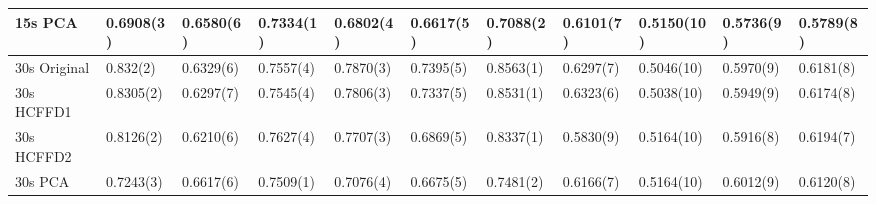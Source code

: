 \documentclass[conference]{IEEEtran}
\begin{document}
\begin{table}[]
\begin{tabular}{|l|l|l|l|l|l|l|l|l|l|l|l|l|l|l|l|l|l|l|l|l|}
15s PCA           & \multicolumn{3}{l|}{0.6908(3)}                                                & \multicolumn{3}{l|}{0.6580(6)}       & \multicolumn{3}{l|}{0.7334(1)}       & \multicolumn{3}{l|}{0.6802(4)}                                                    & \multicolumn{3}{l|}{0.6617(5)}  & 0.7088(2)                                                & 0.6101(7)                                              & 0.5150(10)    & 0.5736(9)  & 0.5789(8)                                                 \\ \hline
30s Original      & \multicolumn{3}{l|}{0.832(2)}                                                 & \multicolumn{3}{l|}{0.6329(6)}       & \multicolumn{3}{l|}{0.7557(4)}       & \multicolumn{3}{l|}{0.7870(3)}                                                    & \multicolumn{3}{l|}{0.7395(5)}  & 0.8563(1)                                                & 0.6297(7)                                              & 0.5046(10)    & 0.5970(9)  & 0.6181(8)                                                 \\ \hline
30s HCFFD1        & \multicolumn{3}{l|}{0.8305(2)}                                                & \multicolumn{3}{l|}{0.6297(7)}       & \multicolumn{3}{l|}{0.7545(4)}       & \multicolumn{3}{l|}{0.7806(3)}                                                    & \multicolumn{3}{l|}{0.7337(5)}  & 0.8531(1)                                                & 0.6323(6)                                              & 0.5038(10)    & 0.5949(9)  & 0.6174(8)                                                 \\ \hline
30s HCFFD2        & \multicolumn{3}{l|}{0.8126(2)}                                                & \multicolumn{3}{l|}{0.6210(6)}       & \multicolumn{3}{l|}{0.7627(4)}       & \multicolumn{3}{l|}{0.7707(3)}                                                    & \multicolumn{3}{l|}{0.6869(5)}  & 0.8337(1)                                                & 0.5830(9)                                              & 0.5164(10)    & 0.5916(8)  & 0.6194(7)                                                 \\ \hline
30s PCA           & \multicolumn{3}{l|}{0.7243(3)}                                                & \multicolumn{3}{l|}{0.6617(6)}       & \multicolumn{3}{l|}{0.7509(1)}       & \multicolumn{3}{l|}{0.7076(4)}                                                    & \multicolumn{3}{l|}{0.6675(5)}  & 0.7481(2)                                                & 0.6166(7)                                              & 0.5164(10)    & 0.6012(9)  & 0.6120(8)                                                 \\ \hline

\end{tabular}
\end{table}
\end{document}
